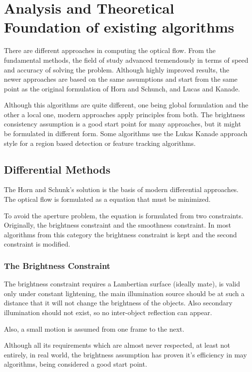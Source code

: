 \documentclass[12pt,a4paper,twoside]{report}
\begin{document}
\chapter{Analysis and Theoretical Foundation of existing algorithms}
\label{ch:analysis}

There are different approaches in computing the optical flow. From the fundamental methods, the field of study advanced tremendously in terms of speed and accuracy of solving the problem. Although highly improved results, the newer approaches are based on the same assumptions and start from the same point as the original formulation of Horn and Schunch, and Lucas and Kanade. 

Although this algorithms are quite different, one being global formulation and the other a local one, modern approaches apply principles from both. The brightness consistency assumption is a good start point for many approaches, but it might be formulated in different form. Some algorithms use the Lukas Kanade approach style for a region based detection or feature tracking algorithms.




\section{Differential Methods}
The Horn and Schunk's solution is the basis of modern differential approaches. The optical flow is formulated as a equation that must be minimized.

To avoid the aperture problem, the equation is formulated from two constraints. Originally, the brightness constraint and the smoothness constraint. In most algorithms from this category the brightness constraint is kept and the second constraint is modified.
\subsection{The Brightness Constraint} \label{BrightnessConstr}

The brightness constraint requires a Lambertian surface (ideally mate), is valid only under constant lightening, the main illumination source should be at such a distance that it will not change the brightness of the objects. Also secondary illumination should not exist, so no inter-object reflection can appear.

 Also, a small motion is assumed from one frame to the next. 
 
Although all its  requirements which are almost never respected, at least not entirely, in real world, the brightness assumption has proven it's efficiency in may algorithms, being considered a good start point.
\end{document}
